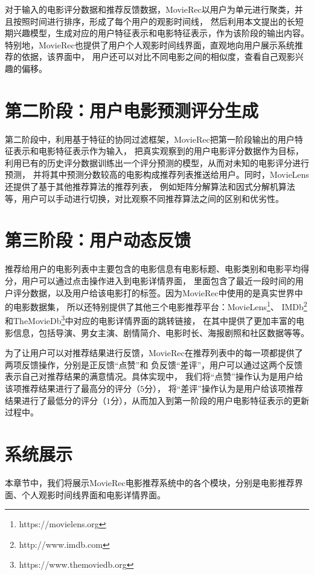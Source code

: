 对于输入的电影评分数据和推荐反馈数据，MovieRec以用户为单元进行聚类，并且按照时间进行排序，形成了每个用户的观影时间线，
然后利用本文提出的长短期兴趣模型，生成对应的用户特征表示和电影特征表示，作为该阶段的输出内容。
特别地，MovieRec也提供了用户个人观影时间线界面，直观地向用户展示系统推荐的依据，该界面中，
用户还可以对比不同电影之间的相似度，查看自己观影兴趣的偏移。

\section{第二阶段：用户电影预测评分生成}
第二阶段中，利用基于特征的协同过滤框架，MovieRec把第一阶段输出的用户特征表示和电影特征表示作为输入，
把真实观察到的用户电影评分数据作为目标，利用已有的历史评分数据训练出一个评分预测的模型，从而对未知的电影评分进行预测，
并将其中预测分数较高的电影构成推荐列表推送给用户。同时，MovieLens还提供了基于其他推荐算法的推荐列表，
例如矩阵分解算法和因式分解机算法等，用户可以手动进行切换，对比观察不同推荐算法之间的区别和优劣性。

\section{第三阶段：用户动态反馈}
推荐给用户的电影列表中主要包含的电影信息有电影标题、电影类别和电影平均得分，用户可以通过点击操作进入到电影详情界面，
里面包含了最近一段时间的用户评分数据，以及用户给该电影打的标签。因为MovieRec中使用的是真实世界中的电影数据集，
所以还特别提供了其他三个电影推荐平台：MovieLens\footnote{https://movielens.org}、
IMDb\footnote{http://www.imdb.com}和TheMovieDb\footnote{https://www.themoviedb.org}中对应的电影详情界面的跳转链接，
在其中提供了更加丰富的电影信息，包括导演、男女主演、剧情简介、电影时长、海报剧照和社区数据等等。

为了让用户可以对推荐结果进行反馈，MovieRec在推荐列表中的每一项都提供了两项反馈操作，分别是正反馈``点赞''和
负反馈``差评''，用户可以通过这两个反馈表示自己对推荐结果的满意情况。具体实现中，
我们将``点赞''操作认为是用户给该项推荐结果进行了最高分的评分（$5$分），
将``差评''操作认为是用户给该项推荐结果进行了最低分的评分（$1$分），从而加入到第一阶段的用户电影特征表示的更新过程中。

\section{系统展示}
本章节中，我们将展示MovieRec电影推荐系统中的各个模块，分别是电影推荐界面、个人观影时间线界面和电影详情界面。

